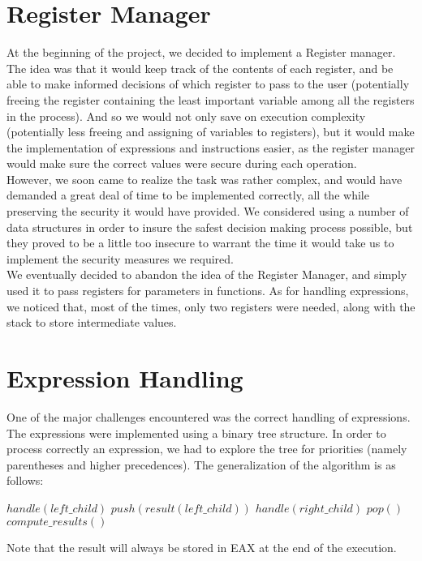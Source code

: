 \documentclass{scrartcl}
\begin{document}
\section{Register Manager}
At the beginning of the project, we decided to implement a Register manager. The idea was that it would keep track of the contents of each register, and be able to make informed decisions of which register to pass to the user (potentially freeing the register containing the least important variable among all the registers in the process). And so we would not only save on execution complexity (potentially less freeing and assigning of variables to registers), but it would make the implementation of expressions and instructions easier, as the register manager would make sure the correct values were secure during each operation.\\

However, we soon came to realize the task was rather complex, and would have demanded a great deal of time to be implemented correctly, all the while preserving the security it would have provided. We considered using a number of data structures in order to insure the safest decision making process possible, but they proved to be a little too insecure to warrant the time it would take us to implement the security measures we required.\\

We eventually decided to abandon the idea of the Register Manager, and simply used it to pass registers for parameters in functions. As for handling expressions, we noticed that, most of the times, only two registers were needed, along with the stack to store intermediate values.

\section{Expression Handling}
One of the major challenges encountered was the correct handling of expressions.
The expressions were implemented using a binary tree structure. In order to process correctly an expression, we had to explore the tree for priorities (namely parentheses and higher precedences). The generalization of the algorithm is as follows:
\vspace{0.5cm}
\begin{algorithmic}
\State $handle(left\_child)$
\State $push(result(left\_child))$
\State $handle(right\_child)$
\State $pop()$
\State $compute\_results()$
\EndIf
\end{algorithmic}
\vspace{0.5cm}
Note that the result will always be stored in EAX at the end of the execution.\\
\end{document}
